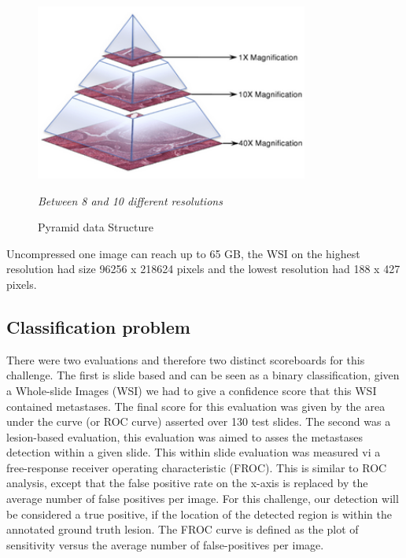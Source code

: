 \documentclass{article}
\begin{document}
\begin{figure}[!ht]
\centering
\includegraphics[width=0.8\textwidth]{pyramid.png}
\caption{Pyramid data Structure}
\textit{Between 8 and 10 different resolutions}
\label{fig: Pyramid}
\end{figure}
Uncompressed one image can reach up to 65 GB, the WSI on the highest resolution had size 96256 x 218624 pixels and the lowest resolution had 188 x 427 pixels.


\subsection{Classification problem}
There were two evaluations and therefore two distinct scoreboards for this challenge. The first is slide based and can be seen as a binary classification, given a Whole-slide Images (WSI) we had to give a confidence score that this WSI contained metastases. The final score for this evaluation was given by the area under the curve (or ROC curve) asserted over 130 test slides. The second was a lesion-based evaluation, this evaluation was aimed to asses the metastases detection within a given slide. This within slide evaluation was measured vi a free-response receiver operating characteristic (FROC). This is similar to ROC analysis, except that the false positive rate on the x-axis is replaced by the average number of false positives per image. For this challenge, our detection will be considered a true positive, if the location of the detected region is within the annotated ground truth lesion. The FROC curve is defined as the plot of sensitivity versus the average number of false-positives per image. 
\end{document}
